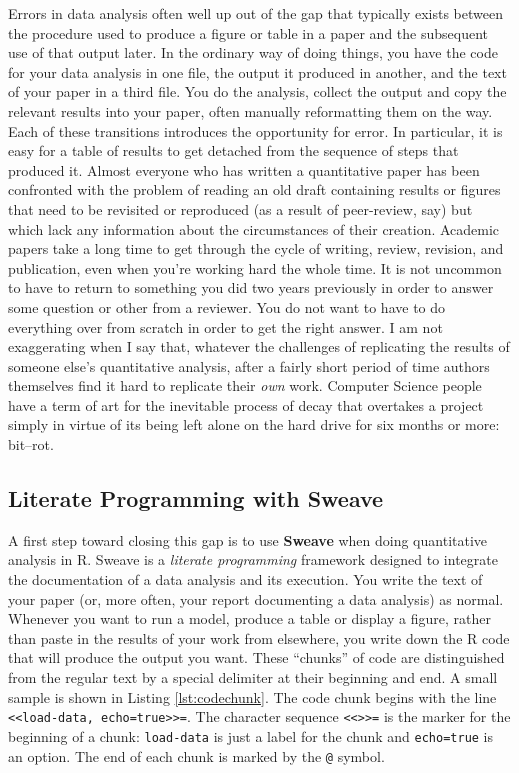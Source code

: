 \documentclass[11pt,article,oneside]{memoir}
\begin{document}
Errors in data analysis often well up out of the gap that typically
exists between the procedure used to produce a figure or table in a
paper and the subsequent use of that output later. In the ordinary way
of doing things, you have the code for your data analysis in one file,
the output it produced in another, and the text of your paper in a
third file. You do the analysis, collect the output and copy the
relevant results into your paper, often manually reformatting them on
the way. Each of these transitions introduces the opportunity for
error. In particular, it is easy for a table of results to get
detached from the sequence of steps that produced it. Almost everyone
who has written a quantitative paper has been confronted with the
problem of reading an old draft containing results or figures that
need to be revisited or reproduced (as a result of peer-review, say)
but which lack any information about the circumstances of their
creation. Academic papers take a long time to get through the cycle of
writing, review, revision, and publication, even when you're working
hard the whole time. It is not uncommon to have to return to something
you did two years previously in order to answer some question or other
from a reviewer. You do not want to have to do everything over from
scratch in order to get the right answer. I am not exaggerating when I
say that, whatever the challenges of replicating the results of
someone else's quantitative analysis, after a fairly short period of
time authors themselves find it hard to replicate their \emph{own}
work. Computer Science people have a term of art for the inevitable
process of decay that overtakes a project simply in virtue of its
being left alone on the hard drive for six months or more: bit--rot.
\subsection*{Literate Programming with Sweave}
\label{sec-6_1}

A first step toward closing this gap is to use \textbf{Sweave} when
doing quantitative analysis in R. Sweave is a \emph{literate
  programming} framework designed to integrate the documentation of a
data analysis and its execution. You write the text of your paper (or,
more often, your report documenting a data analysis) as
normal. Whenever you want to run a model, produce a table or display a
figure, rather than paste in the results of your work from elsewhere,
you write down the R code that will produce the output you want. These
``chunks'' of code are distinguished from the regular text by a
special delimiter at their beginning and end. A small sample is shown
in Listing \ref{lst:codechunk}. The code chunk begins with the line
\texttt{<<load-data, echo=true>>=}. The character sequence
\texttt{<<>>=} is the marker for the beginning of a chunk:
\texttt{load-data} is just a label for the chunk and
\texttt{echo=true} is an option. The end of each chunk is marked by
the \texttt{@} symbol.
\end{document}

